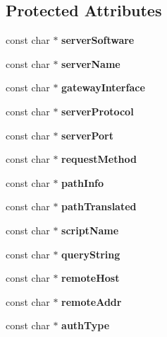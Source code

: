 \subsection*{Protected Attributes}
\begin{CompactItemize}
\item 
const char $\ast$ \textbf{serverSoftware}\label{classRawRequest_5882cca487fab9ea9e5a5080615a91fe}

\item 
const char $\ast$ \textbf{serverName}\label{classRawRequest_400bcd9ca74ca19a6099dbe44485c0ec}

\item 
const char $\ast$ \textbf{gatewayInterface}\label{classRawRequest_0b078d2100685a1eff636bf451108475}

\item 
const char $\ast$ \textbf{serverProtocol}\label{classRawRequest_101587a4e16537c759874c02cfb835ce}

\item 
const char $\ast$ \textbf{serverPort}\label{classRawRequest_a76c2bcb5ed1ea9340a3c4f467434b3a}

\item 
const char $\ast$ \textbf{requestMethod}\label{classRawRequest_381657a90598626b650d299435ccc2fe}

\item 
const char $\ast$ \textbf{pathInfo}\label{classRawRequest_fcee8dfa43a28b2fda1aad9793391349}

\item 
const char $\ast$ \textbf{pathTranslated}\label{classRawRequest_d88d08f7041b4b4667f7173fa30f89ce}

\item 
const char $\ast$ \textbf{scriptName}\label{classRawRequest_8b3b50077361fe8038857941b4c60941}

\item 
const char $\ast$ \textbf{queryString}\label{classRawRequest_be27f24c3f50f2bfa5b2501f5c7bbc3e}

\item 
const char $\ast$ \textbf{remoteHost}\label{classRawRequest_652bc46690f5eaf659d3dfbe718261a6}

\item 
const char $\ast$ \textbf{remoteAddr}\label{classRawRequest_409dd05e1aaf7542c07a5e72713cbc2b}

\item 
const char $\ast$ \textbf{authType}\label{classRawRequest_19b3418081262722d3dc88eba8ea88b9}


\end{CompactItemize}
